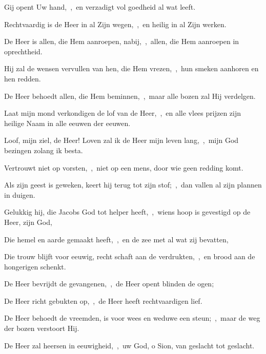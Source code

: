 \documentclass[12pt,twoside,a5paper]{article}
\begin{document}
\begin{halfparskip}
  Gij opent Uw hand,~\sep\ en verzadigt vol goedheid al wat leeft.

  Rechtvaardig is de Heer in al Zijn wegen,~\sep\ en heilig in al Zijn werken.

  De Heer is allen, die Hem aanroepen, nabij,~\sep\ allen, die Hem aanroepen in oprechtheid.

  Hij zal de wensen vervullen van hen, die Hem vrezen,~\sep\ hun smeken aanhoren en hen redden.

  De Heer behoedt allen, die Hem beminnen,~\sep\ maar alle bozen zal Hij verdelgen.

  Laat mijn mond verkondigen de lof van de Heer,~\sep\ en alle vlees prijzen zijn heilige Naam in alle eeuwen der eeuwen.
\end{halfparskip}

\begin{halfparskip}
   Loof, mijn ziel, de Heer! Loven zal ik de Heer mijn leven lang,~\sep\ mijn God bezingen zolang ik besta.

  Vertrouwt niet op vorsten,~\sep\ niet op een mens, door wie geen redding komt.

  Als zijn geest is geweken, keert hij terug tot zijn stof;~\sep\ dan vallen al zijn plannen in duigen.

  Gelukkig hij, die Jacobs God tot helper heeft,~\sep\ wiens hoop is gevestigd op de Heer, zijn God,

  Die hemel en aarde gemaakt heeft,~\sep\ en de zee met al wat zij bevatten,

  Die trouw blijft voor eeuwig, recht schaft aan de verdrukten,~\sep\ en brood aan de hongerigen schenkt.

  De Heer bevrijdt de gevangenen,~\sep\ de Heer opent blinden de ogen;

  De Heer richt gebukten op,~\sep\ de Heer heeft rechtvaardigen lief.

  De Heer behoedt de vreemden, is voor wees en weduwe een steun;~\sep\ maar de weg der bozen verstoort Hij.

  De Heer zal heersen in eeuwigheid,~\sep\ uw God, o Sion, van geslacht tot geslacht.
\end{halfparskip}
\end{document}
